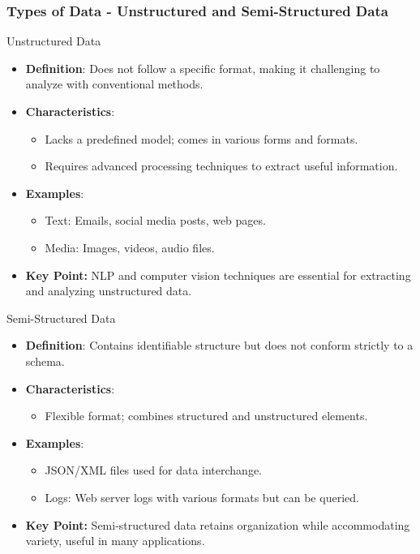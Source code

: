 \documentclass[aspectratio=169]{beamer}
\begin{document}
\begin{frame}[fragile]
    \frametitle{Types of Data - Unstructured and Semi-Structured Data}
    \begin{block}{Unstructured Data}
        \begin{itemize}
            \item \textbf{Definition}: Does not follow a specific format, making it challenging to analyze with conventional methods.
            \item \textbf{Characteristics}:
                \begin{itemize}
                    \item Lacks a predefined model; comes in various forms and formats.
                    \item Requires advanced processing techniques to extract useful information.
                \end{itemize}
            \item \textbf{Examples}:
                \begin{itemize}
                    \item Text: Emails, social media posts, web pages.
                    \item Media: Images, videos, audio files.
                \end{itemize}
            \item \textbf{Key Point:} NLP and computer vision techniques are essential for extracting and analyzing unstructured data.
        \end{itemize}
    \end{block}

    \begin{block}{Semi-Structured Data}
        \begin{itemize}
            \item \textbf{Definition}: Contains identifiable structure but does not conform strictly to a schema.
            \item \textbf{Characteristics}:
                \begin{itemize}
                    \item Flexible format; combines structured and unstructured elements.
                \end{itemize}
            \item \textbf{Examples}:
                \begin{itemize}
                    \item JSON/XML files used for data interchange.
                    \item Logs: Web server logs with various formats but can be queried.
                \end{itemize}
            \item \textbf{Key Point:} Semi-structured data retains organization while accommodating variety, useful in many applications.
        \end{itemize}
    \end{block}
\end{frame}
\end{document}
